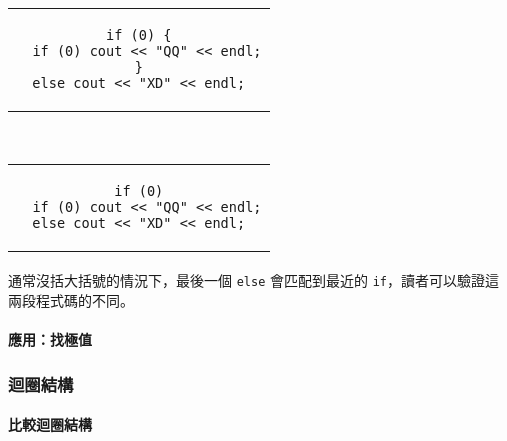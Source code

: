 \documentclass[12pt,a4paper,oneside]{article}
\begin{document}
\begin{CJK}{UTF8}{bkai}
\begin{code}[h!]
\centering
\begin{subcode}{.5\textwidth}
  \centering
  \begin{tabular}{c}
  \begin{lstlisting}
if (0) {
  if (0) cout << "QQ" << endl;
}
else cout << "XD" << endl;
  \end{lstlisting}
  \end{tabular}
  \caption{危險的 \lstinline!else!}
  \label{program:struct:code:dangling:else:1}
\end{subcode}
~
\begin{subcode}{.45\textwidth}
  \centering
  \begin{tabular}{c}
  \begin{lstlisting}
if (0)
  if (0) cout << "QQ" << endl;
else cout << "XD" << endl;
  \end{lstlisting}
  \end{tabular}
  \caption{編譯器會不知道是哪一個 \lstinline!if! 的 \lstinline!else!}
  \label{program:struct:code:dangling:else:2}
\end{subcode}
\caption{懸置的 \lstinline!else!}
\label{program:struct:code:dangling:else}
\end{code}

\paragraph{}通常沒括大括號的情況下，最後一個 \lstinline!else! 會匹配到最近的 \lstinline!if!，讀者可以驗證這兩段程式碼的不同。

\paragraph{應用：找極值}

\subsubsection{迴圈結構}

\paragraph{比較迴圈結構}


\end{CJK}
\end{document}

